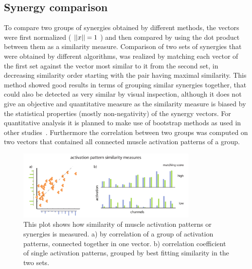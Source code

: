 \subsection{Synergy comparison} %
\label{sg:sub:comp}
To compare two groups of synergies obtained by different methods, the vectors were first normalized ( $\left|\left|x\right|\right| = 1$ ) and then compared by using the dot product between them as a similarity measure. Comparison of two sets of synergies that were obtained by different algorithms, was realized by matching each vector of the first set against the vector most similar to it from the second set, in decreasing similarity order starting with the pair having maximal similarity. 
This method showed good results in terms of grouping similar synergies together, that could also be detected as very similar by visual inspection, although it does not give an objective and quantitative measure as the similarity measure is biased by the statistical properties (mostly non-negativity) of the synergy vectors. For quantitative analysis it is planned to make use of bootstrap methods as used in other studies~\citet{AdAvella:2005p2330}. Furthermore the correlation between two groups was computed on two vectors that contained all connected muscle activation patterns of a group.
\begin{figure}[ht]
	\centering
		\includegraphics[width=0.8\textwidth]{images/match_explanation.pdf}
	\caption{This plot shows how similarity of muscle activation patterns or synergies is measured. a) by correlation of a group of activation patterns, connected together in one vector. b) correlation coefficient of single activation patterns, grouped by best fitting similarity in the two sets. }
	\label{sg:fig:images_match_explanation}
\end{figure}








